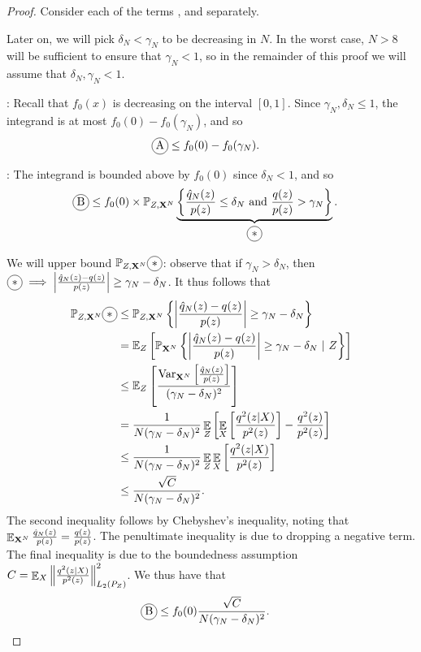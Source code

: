 \begin{proof}
Consider each of the terms ,  and   separately.

Later on, we will pick $\delta_N < \gamma_N$ to be decreasing in $N$.
In the worst case, $N>8$ will be sufficient to ensure that $\gamma_N < 1$, so in the remainder of this proof we will assume that $\delta_N, \gamma_N < 1$.

: 
Recall that $f_0(x)$ is decreasing on the interval $[0,1]$.
Since $\gamma_N, \delta_N \leq 1$, the integrand is at most $f_0(0) - f_0(\gamma_N)$, and so
\begin{align*}
    \encircle{A} &\leq f_0(0) - f_0(\gamma_N).
\end{align*}


:
The integrand is bounded above by $f_0(0)$ since $\delta_N<1$, and so 
\begin{align*}
    \encircle{B} &\leq f_0(0) \times \mathbb{P}_{Z,\XN}
    \underbrace{
    \left\lbrace \frac{\hat{q}_N(z)}{p(z)} \leq \delta_N \text{ and } \frac{q(z)}{p(z)} > \gamma_N \right\rbrace}_{\encircle{$*$}}.
\end{align*}

We will upper bound $\mathbb{P}_{Z,\XN} \encircle{$*$}$:
observe that if $\gamma_N > \delta_N$, then  $\encircle{$*$}\implies \left| \frac{\hat{q}_N(z) - q(z)}{p(z)} \right| \geq \gamma_N - \delta_N$.
It thus follows that
\begin{align*}
    \mathbb{P}_{Z,\XN} \encircle{$*$} &\leq  \mathbb{P}_{Z,\XN} \left\lbrace \left| \frac{\hat{q}_N(z) - q(z)}{p(z)} \right| \geq \gamma_N - \delta_N  \right\rbrace\\
    &= \mathbb{E}_Z\left[ \mathbb{P}_{\XN} \left\lbrace \left| \frac{\hat{q}_N(z) - q(z)}{p(z)} \right| \geq \gamma_N - \delta_N  \  | \ Z \right\rbrace \right]\\
    &\leq \mathbb{E}_Z\left[ 
    \frac{\text{Var}_{\XN}\left[ 
    \frac{\hat{q}_N(z)}{p(z)}
    \right]}{(\gamma_N - \delta_N)^2}
    \right]\\
    &= \frac{1}{N(\gamma_N - \delta_N)^2}  \E_Z \left[ \E_{X}\left[
     \frac{q^2(z|X)}{p^2(z)}\right] - \frac{q^2(z)}{p^2(z)} \right]\\
    &\leq \frac{1}{N(\gamma_N - \delta_N)^2}  \E_Z \E_{X}\left[
     \frac{q^2(z|X)}{p^2(z)}\right]\\
    &\leq \frac{\sqrt{C} }{N(\gamma_N - \delta_N)^2}.\\
\end{align*}
The second inequality follows by Chebyshev's inequality, noting that $\mathop{\mathbb{E}}_{\mathbf{X}^N} \frac{\hat{q}_N(z)}{p(z)} = \frac{q(z)}{p(z)}$.
The penultimate inequality is due to dropping a negative term.
The final inequality is due to the boundedness assumption $C =  \mathop{\mathbb{E}}_{X}\left\| \frac{q^2(z|X)}{p^2(z)} \right\|^2_{L_2(P_Z)}$.
We thus have that 
\begin{align*}
    \encircle{B}
    &\leq f_0(0) \frac{\sqrt{C}}{N (\gamma_N - \delta_N)^2}.
\end{align*}



\end{proof}
